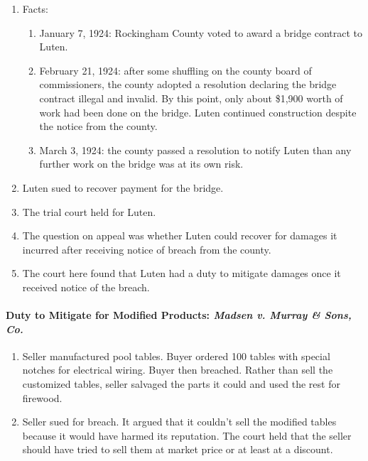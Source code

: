 \begin{enumerate}
    \item Facts:
    \begin{enumerate}
        \item January 7, 1924: Rockingham County voted to award a bridge 
        contract to Luten.
        \item February 21, 1924: after some shuffling on the county board of 
        commissioners, the county adopted a resolution declaring the bridge 
        contract illegal and invalid. By this point, only about \$1,900 worth 
        of work had been done on the bridge. Luten continued construction 
        despite the notice from the county.
        \item March 3, 1924: the county passed a resolution to notify Luten 
        than any further work on the bridge was at its own risk.
    \end{enumerate}
    \item Luten sued to recover payment for the bridge.
    \item The trial court held for Luten.
    \item The question on appeal was whether Luten could recover for damages 
    it incurred after receiving notice of breach from the county.
    \item The court here found that Luten had a duty to mitigate damages once 
    it received notice of the breach.
\end{enumerate}

\paragraph{Duty to Mitigate for Modified Products: \emph{Madsen v. Murray \& 
Sons, Co.}}

\begin{enumerate}
    \item Seller manufactured pool tables. Buyer ordered 100 tables with 
    special notches for electrical wiring. Buyer then breached. Rather than 
    sell the customized tables, seller salvaged the parts it could and used 
    the rest for firewood.
    \item Seller sued for breach. It argued that it couldn't sell the modified 
    tables because it would have harmed its reputation. The court held that 
    the seller should have tried to sell them at market price or at least at a 
    discount.
\end{enumerate}

